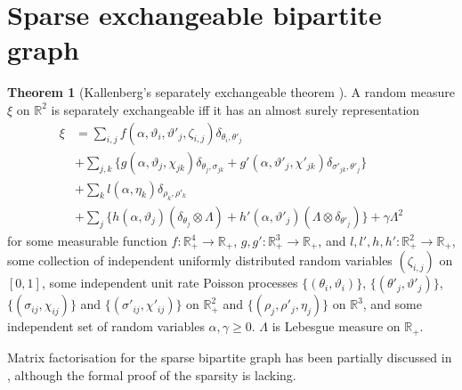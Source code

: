 \documentclass{article}
\theoremstyle{definition}
\newtheorem{theorem}[definition]{Theorem}
\begin{document}
\section{Sparse exchangeable bipartite graph}

\begin{theorem}[Kallenberg's separately exchangeable theorem \citep{Kallenberg1990}] A random measure $\xi$ on $\mathbb{R}^2$ is separately exchangeable iff it has an almost surely representation
\begin{align}
\xi &= \sum_{i,j} f(\alpha, \vartheta_i, \vartheta'_j, \zeta_{i,j})\delta_{\theta_i, \theta'_j} \\
&+ \sum_{j,k}\{g(\alpha, \vartheta_j, \chi_{jk})\delta_{\theta_j,\sigma_{jk}} + g'(\alpha, \vartheta'_j, \chi'_{jk})\delta_{\sigma'_{jk},\theta'_j}\}\\
&+ \sum_{k}l(\alpha, \eta_k)\delta_{\rho_k,\rho'_k} \\
&+\sum_j\{h(\alpha, \vartheta_j)(\delta_{\theta_j} \otimes \Lambda) + h'(\alpha, \vartheta'_j)(\Lambda \otimes \delta_{\theta'_j})\} + \gamma \Lambda^2
\end{align}
for some measurable function $f:\mathbb{R}_+^4 \rightarrow \mathbb{R}_+$, $g,g':\mathbb{R}_+^3 \rightarrow \mathbb{R}_+$, and $l, l', h, h': \mathbb{R}_+^2\rightarrow\mathbb{R}_+$, some collection of independent uniformly distributed random variables $(\zeta_{i,j})$ on $[0,1]$, some independent unit rate Poisson processes $\{(\theta_i, \vartheta_i)\}$, $\{(\theta'_j, \vartheta'_j)\}$, $\{(\sigma_{ij}, \chi_{ij})\}$ and $\{(\sigma'_{ij}, \chi'_{ij})\}$ on $\mathbb{R}_+^2$ and $\{(\rho_j, \rho'_j, \eta_j)\}$ on $\mathbb{R}^3$, and some independent set of random variables $\alpha, \gamma \geq 0$. $\Lambda$ is Lebesgue measure on $\mathbb{R}_+$.
\end{theorem}
Matrix factorisation for the sparse bipartite graph has been partially discussed in \citep{Caron2012}, although the formal proof of the sparsity is lacking.



\end{document}
